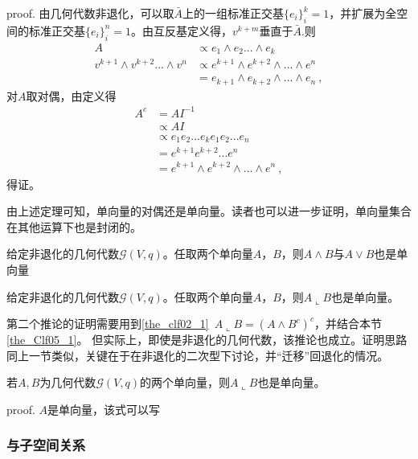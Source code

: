 proof.
由几何代数非退化，可以取$\bar A$上的一组标准正交基$\{e_i\}^k_i=1$，并扩展为全空间的标准正交基$\{e_i\}^n_i=1$。由互反基定义得，$v^{k+m}$垂直于$\bar A$.则
\begin{equation}
\begin{aligned}
A&\propto e_1\wedge e_2...\wedge e_k\\
v^{k+1}\wedge v^{k+2}...\wedge v^n&\propto e^{k+1}\wedge e^{k+2}\wedge...\wedge e^n\\
&=e_{k+1}\wedge e_{k+2}\wedge...\wedge e_n~,
\end{aligned}
\end{equation}
对$A$取对偶，由定义得
\begin{equation}
\begin{aligned}
A^c&=AI^{-1}\\
&\propto AI\\
&\propto e_1 e_2... e_k e_1 e_2... e_n\\
&=e^{k+1} e^{k+2}... e^n\\
&=e^{k+1}\wedge e^{k+2}\wedge...\wedge e^n~,
\end{aligned}
\end{equation}
得证。

由上述定理可知，单向量的对偶还是单向量。读者也可以进一步证明，单向量集合在其他运算下也是封闭的。
\begin{corollary}{}
给定非退化的几何代数$\mathcal G(V,q)$。任取两个单向量$A$，$B$，则$A\wedge B$与$A\vee B$也是单向量
\end{corollary}
\begin{corollary}{}
给定非退化的几何代数$\mathcal G(V,q)$。任取两个单向量$A$，$B$，则$A\llcorner B$也是单向量。
\end{corollary}
第二个推论的证明需要用到\autoref{the_clf02_1}~$A\llcorner B=(A\wedge B^c)^c$，并结合本节\autoref{the_Clf05_1}。
但实际上，即使是非退化的几何代数，该推论也成立。证明思路同上一节类似，关键在于在非退化的二次型下讨论，并“迁移”回退化的情况。
\begin{corollary}{}
若$A,B$为几何代数$\mathcal G(V,q)$的两个单向量，则$A\llcorner B$也是单向量。
\end{corollary}
proof.
$A$是单向量，该式可以写

\subsubsection{与子空间关系}